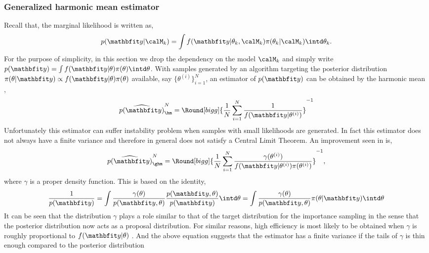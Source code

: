 \subsubsection{Generalized harmonic mean estimator}
\label{ssub:Generalized harmonic mean estimator}

Recall that, the marginal likelihood is written as,
\begin{equation*}
  p(\data|\calM_k) = \int
  f(\data|\theta_k,\calM_k)\pi(\theta_k|\calM_k)\intd\theta_k.
\end{equation*}
For the purpose of simplicity, in this section we drop the dependency on the
model $\calM_k$ and simply write $p(\data) = \int
f(\data|\theta)\pi(\theta)\intd\theta$. With samples generated by an \mcmc
algorithm targeting the posterior distribution $\pi(\theta|\data) \propto
f(\data|\theta) \pi(\theta)$ available, say $\{\theta^{(i)}\}_{i=1}^N$, an
estimator of $p(\data)$ can be obtained by the harmonic mean
\cite{Newton:1994wm},
\begin{equation}
  \widehat{p(\data)}_{\hm}^N =
  \Round[bigg]{\frac{1}{N}\sum_{i=1}^N\frac{1}{f(\data|\theta^{(i)})}}^{-1}
\end{equation}
Unfortunately this estimator can suffer instability problem when samples with
small likelihoods are generated. In fact this estimator does not always have a
finite variance and therefore in general does not satisfy a Central Limit
Theorem. An improvement seen in \cite{Kass:1995vb} is,
\begin{equation}
  \widehat{p(\data)}_{\ghm}^N = \Round[bigg]{
    \frac{1}{N}\sum_{i=1}^N
    \frac{\gamma(\theta^{(i)})}{f(\data|\theta^{(i)})\pi(\theta^{(i)})}}^{-1},
\end{equation}
where $\gamma$ is a proper density function. This is based on the identity,
\begin{equation}
  \frac{1}{p(\data)}
  = \int \frac{\gamma(\theta)}{p(\data,\theta)}
  \frac{p(\data,\theta)}{p(\data)} \intd \theta
  = \int \frac{\gamma(\theta)}{p(\data,\theta)} \pi(\theta|\data) \intd \theta
\end{equation}
It can be seen that the distribution $\gamma$ plays a role similar to that of
the target distribution for the importance sampling in the sense that the
posterior distribution now acts as a proposal distribution. For similar
reasons, high efficiency is most likely to be obtained when $\gamma$ is
roughly proportional to $f(\data|\theta)$ \cite{Kass:1995vb}. And the above
equation suggests that the estimator has a finite variance if the tails of
$\gamma$ is thin enough compared to the posterior distribution
